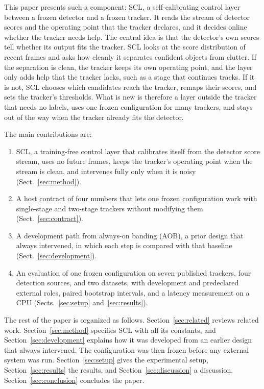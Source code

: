 \documentclass[pdflatex,sn-mathphys-num,iicol]{sn-jnl}
\newcommand{\scl}{SCL}
\newcommand{\aob}{AOB}
\begin{document}
This paper presents such a component: \scl{}, a self-calibrating control layer
between a frozen detector and a frozen tracker. It reads the stream of detector scores
and the operating point that the tracker declares, and it decides online
whether the tracker needs help. The central idea is that the detector's own
scores tell whether its output fits the tracker. \scl{} looks at the score
distribution of recent frames and asks how cleanly it separates confident
objects from clutter. If the separation is clean, the tracker keeps its own
operating point, and the layer only adds help that the tracker lacks, such as
a stage that continues tracks. If it is not, \scl{} chooses which candidates reach the
tracker, remaps their scores, and sets the tracker's thresholds. What is new
is therefore a layer outside the tracker that needs no labels, uses one frozen
configuration for many trackers, and stays out of the way when the tracker
already fits the detector.

The main contributions are:
\begin{enumerate}
\item \scl{}, a training-free control layer that calibrates itself from the detector
      score stream, uses no future frames, keeps the tracker's operating point
      when the stream is clean, and intervenes fully only when it is noisy
      (Sect.~\ref{sec:method}).
\item A host contract of four numbers that lets one frozen configuration work
      with single-stage and two-stage trackers
      without modifying them (Sect.~\ref{sec:contract}).
\item A development path from always-on banding (\aob{}), a prior design that
      always intervened, in which
      each step is compared with that baseline (Sect.~\ref{sec:development}).
\item An evaluation of one frozen configuration on seven published trackers,
      four detection sources, and two datasets, with development and
      predeclared external roles, paired bootstrap intervals, and a
      latency measurement on a CPU (Sects.~\ref{sec:setup}
      and~\ref{sec:results}).
\end{enumerate}

The rest of the paper is organized as follows. Section~\ref{sec:related}
reviews related work. Section~\ref{sec:method} specifies \scl{} with all its
constants, and Section~\ref{sec:development} explains how it was developed
from an earlier design that always intervened. The configuration was then
frozen before any external system was run.
Section~\ref{sec:setup} gives the experimental setup,
Section~\ref{sec:results} the results, and Section~\ref{sec:discussion} a
discussion. Section~\ref{sec:conclusion} concludes the paper.
\end{document}
